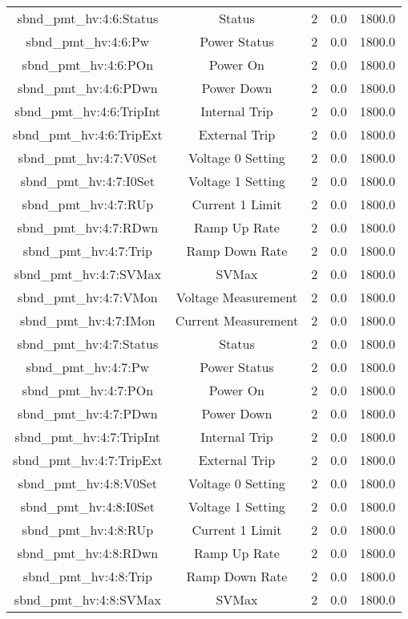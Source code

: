 \begin{center}
\begin{longtable}{c | c c c c }
sbnd\_pmt\_hv:4:6:Status & Status & 2 & 0.0 & 1800.0\\ 
sbnd\_pmt\_hv:4:6:Pw & Power Status & 2 & 0.0 & 1800.0\\ 
sbnd\_pmt\_hv:4:6:POn & Power On & 2 & 0.0 & 1800.0\\ 
sbnd\_pmt\_hv:4:6:PDwn & Power Down & 2 & 0.0 & 1800.0\\ 
sbnd\_pmt\_hv:4:6:TripInt & Internal Trip & 2 & 0.0 & 1800.0\\ 
sbnd\_pmt\_hv:4:6:TripExt & External Trip & 2 & 0.0 & 1800.0\\ 
sbnd\_pmt\_hv:4:7:V0Set & Voltage 0 Setting & 2 & 0.0 & 1800.0\\ 
sbnd\_pmt\_hv:4:7:I0Set & Voltage 1 Setting & 2 & 0.0 & 1800.0\\ 
sbnd\_pmt\_hv:4:7:RUp & Current 1 Limit & 2 & 0.0 & 1800.0\\ 
sbnd\_pmt\_hv:4:7:RDwn & Ramp Up Rate & 2 & 0.0 & 1800.0\\ 
sbnd\_pmt\_hv:4:7:Trip & Ramp Down Rate & 2 & 0.0 & 1800.0\\ 
sbnd\_pmt\_hv:4:7:SVMax & SVMax & 2 & 0.0 & 1800.0\\ 
sbnd\_pmt\_hv:4:7:VMon & Voltage Measurement & 2 & 0.0 & 1800.0\\ 
sbnd\_pmt\_hv:4:7:IMon & Current Measurement & 2 & 0.0 & 1800.0\\ 
sbnd\_pmt\_hv:4:7:Status & Status & 2 & 0.0 & 1800.0\\ 
sbnd\_pmt\_hv:4:7:Pw & Power Status & 2 & 0.0 & 1800.0\\ 
sbnd\_pmt\_hv:4:7:POn & Power On & 2 & 0.0 & 1800.0\\ 
sbnd\_pmt\_hv:4:7:PDwn & Power Down & 2 & 0.0 & 1800.0\\ 
sbnd\_pmt\_hv:4:7:TripInt & Internal Trip & 2 & 0.0 & 1800.0\\ 
sbnd\_pmt\_hv:4:7:TripExt & External Trip & 2 & 0.0 & 1800.0\\ 
sbnd\_pmt\_hv:4:8:V0Set & Voltage 0 Setting & 2 & 0.0 & 1800.0\\ 
sbnd\_pmt\_hv:4:8:I0Set & Voltage 1 Setting & 2 & 0.0 & 1800.0\\ 
sbnd\_pmt\_hv:4:8:RUp & Current 1 Limit & 2 & 0.0 & 1800.0\\ 
sbnd\_pmt\_hv:4:8:RDwn & Ramp Up Rate & 2 & 0.0 & 1800.0\\ 
sbnd\_pmt\_hv:4:8:Trip & Ramp Down Rate & 2 & 0.0 & 1800.0\\ 
sbnd\_pmt\_hv:4:8:SVMax & SVMax & 2 & 0.0 & 1800.0\\ 

\end{longtable}
\end{center}
